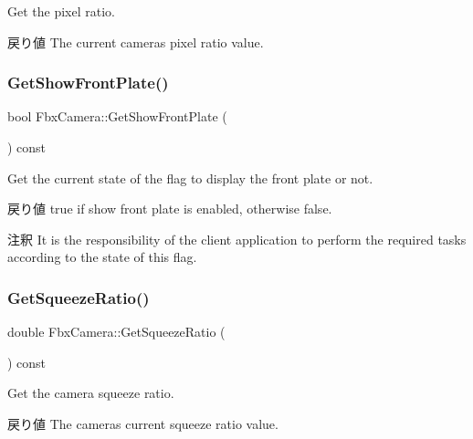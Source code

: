 Get the pixel ratio. \begin{DoxyReturn}{戻り値}
The current camera\textquotesingle{}s pixel ratio value. 
\end{DoxyReturn}
\mbox{\label{class_fbx_camera_ab21048c80c2139f248b1c75cb79fae0b}} 
\subsubsection{\texorpdfstring{Get\+Show\+Front\+Plate()}{GetShowFrontPlate()}}
{\footnotesize\ttfamily bool Fbx\+Camera\+::\+Get\+Show\+Front\+Plate (\begin{DoxyParamCaption}{ }\end{DoxyParamCaption}) const}

Get the current state of the flag to display the front plate or not. \begin{DoxyReturn}{戻り値}
{\ttfamily true} if show front plate is enabled, otherwise {\ttfamily false}. 
\end{DoxyReturn}
\begin{DoxyRemark}{注釈}
It is the responsibility of the client application to perform the required tasks according to the state of this flag. 
\end{DoxyRemark}
\mbox{\label{class_fbx_camera_ac9e1f4cc33e3c927932c577d95c6cd93}} 
\subsubsection{\texorpdfstring{Get\+Squeeze\+Ratio()}{GetSqueezeRatio()}}
{\footnotesize\ttfamily double Fbx\+Camera\+::\+Get\+Squeeze\+Ratio (\begin{DoxyParamCaption}{ }\end{DoxyParamCaption}) const}

Get the camera squeeze ratio. \begin{DoxyReturn}{戻り値}
The camera\textquotesingle{}s current squeeze ratio value. 
\end{DoxyReturn}
\mbox{\label{class_fbx_camera_ac52d0e82cbabac69f8b0dcd212853616}} 
